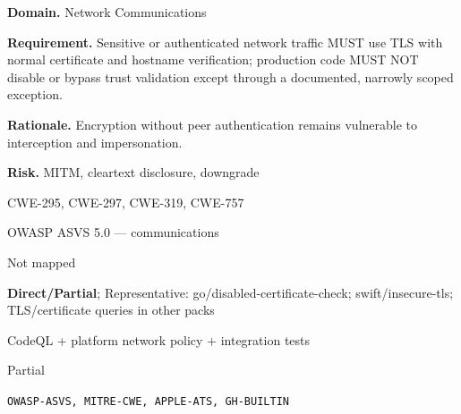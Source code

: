 \documentclass[10pt,letterpaper]{article}
\newcommand{\prioritybadge}[2]{\tcbox[on line,boxrule=0pt,arc=1.2mm,boxsep=0.7mm,left=1mm,right=1mm,top=0.4mm,bottom=0.4mm,colback=#2!12,coltext=#2]{\scriptsize\bfseries #1}}
\begin{document}
\begin{rulebox}[title={\texttt{SCS-ALL-NET-001} \hfill \prioritybadge{Critical Control}{Critical}}]
\textbf{Domain.} Network Communications

\textbf{Requirement.} Sensitive or authenticated network traffic MUST use TLS with normal certificate and hostname verification; production code MUST NOT disable or bypass trust validation except through a documented, narrowly scoped exception.

\textbf{Rationale.} Encryption without peer authentication remains vulnerable to interception and impersonation.

\textbf{Risk.} MITM, cleartext disclosure, downgrade

\begin{description}[leftmargin=2.65cm,labelwidth=2.3cm,style=nextline,itemsep=1pt,topsep=3pt]
  \item[CWE] CWE-295, CWE-297, CWE-319, CWE-757
  \item[OWASP] OWASP ASVS 5.0 --- communications
  \item[CERT] Not mapped
  \item[CodeQL] \textbf{Direct/Partial}; Representative: go/disabled-certificate-check; swift/insecure-tls; TLS/certificate queries in other packs
  \item[Enforcement] CodeQL + platform network policy + integration tests
  \item[Automation] Partial
  \item[Sources] \texttt{OWASP-ASVS, MITRE-CWE, APPLE-ATS, GH-BUILTIN}
\end{description}
\end{rulebox}
\end{document}
